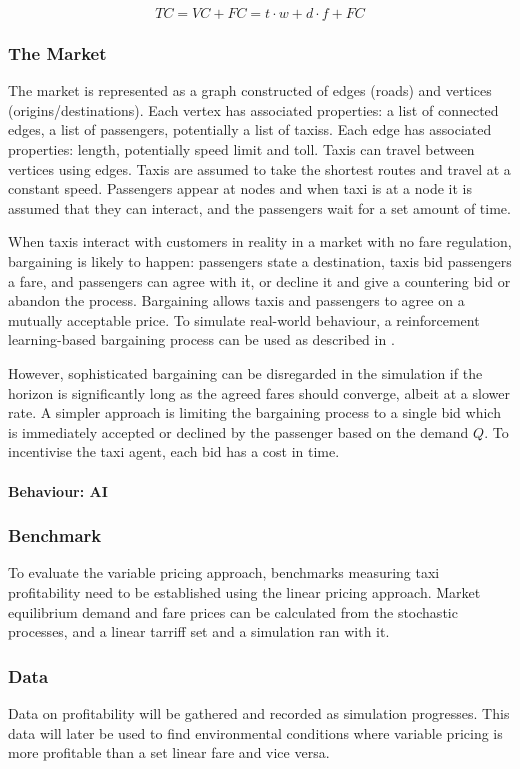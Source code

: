 \[ TC = VC + FC = t \cdot w + d \cdot f + FC \]

\subsubsection{The Market}

The market is represented as a graph constructed of edges (roads) and vertices
(origins/destinations). Each vertex has associated properties: a list of
connected edges, a list of passengers, potentially a list of taxiss. Each edge
has associated properties: length, potentially speed limit and toll. Taxis can
travel between vertices using edges. Taxis are assumed to take the shortest
routes and travel at a constant speed. Passengers appear at nodes and when taxi
is at a node it is assumed that they can interact, and the passengers wait for
a set amount of time.

When taxis interact with customers in reality in a market with no fare
regulation, bargaining is likely to happen: passengers state a destination,
taxis bid passengers a fare, and passengers can agree with it, or decline it
and give a countering bid or abandon the process. Bargaining allows taxis and
passengers to agree on a mutually acceptable price. To simulate real-world
behaviour, a reinforcement learning-based bargaining process can be used as
described in \textcite{Cli1997taxi+bargaining}.

However, sophisticated bargaining can be disregarded in the simulation if the
horizon is significantly long as the agreed fares should converge, albeit at a
slower rate. A simpler approach is limiting the bargaining process to a single
bid which is immediately accepted or declined by the passenger based on the
demand \(Q\). To incentivise the taxi agent, each bid has a cost in time.

\paragraph{Behaviour: AI}

\subsubsection{Benchmark} 

To evaluate the variable pricing approach, benchmarks measuring taxi
profitability need to be established using the linear pricing approach. Market
equilibrium demand and fare prices can be calculated from the stochastic
processes, and a linear tarriff set and a simulation ran with it.

\subsubsection{Data}

Data on profitability will be gathered and recorded as simulation progresses.
This data will later be used to find environmental conditions where variable
pricing is more profitable than a set linear fare and vice versa.
